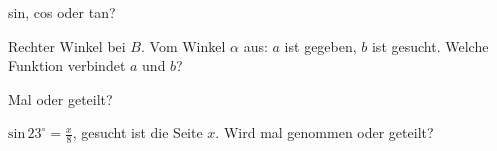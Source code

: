 \setcounter{aufgabe}{11}

\begin{aufgabe}{sin, cos oder tan?}
\begin{teile}
\teil Rechter Winkel bei $B$. Vom Winkel $\alpha$ aus: $a$ ist gegeben, $b$ ist gesucht. Welche Funktion verbindet $a$ und $b$? \\   
\end{teile}
\end{aufgabe}

\begin{aufgabe}{Mal oder geteilt?}
\begin{teile}
\teil $\mathrm{sin}\,23^\circ = \frac{x}{8}$, gesucht ist die Seite $x$. Wird mal genommen oder geteilt? \\  \\ 
\end{teile}
\end{aufgabe}


